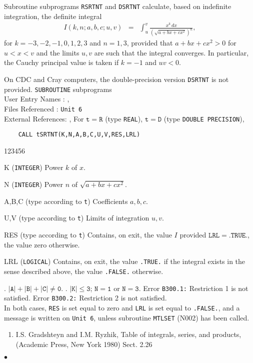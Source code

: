                           
                
\Submitter{}                     
Subroutine subprograms {\tt RSRTNT} and {\tt DSRTNT} calculate, based on
indefinite integration, the definite integral
\begin{eqnarray*}
I(k,n;a,b,c;u,v) & = & \displaystyle \int_u^v
\frac{x^k\,dx}{(\sqrt{a+bx+cx^2})^n},
\end{eqnarray*}
for $k=-3,-2,-1,0,1,2,3$ and $n=1,3$, provided that
$a+bx+cx^2 > 0$ for $u < x < v$ and the limits $u,v$ are such that
the integral converges. In particular, the Cauchy principal value
is taken if $k=-1$ and $uv < 0$.
 
On CDC and Cray computers, the double-precision version {\tt DSRTNT}
is not provided.
\Structure
{\tt SUBROUTINE} subprograms \\
User Entry   Names : , \\
Files  Referenced : {\tt Unit 6} \\
External References: , 
\Usage
For $\mathtt{t=R}$ (type {\tt REAL}), $\mathtt{t=D}$ (type
{\tt DOUBLE PRECISION}),
\begin{verbatim}
    CALL tSRTNT(K,N,A,B,C,U,V,RES,LRL)
\end{verbatim}
\begin{DLtt}{123456}
\item[K] ({\tt INTEGER}) Power $k$ of $x$.
\item[N] ({\tt INTEGER}) Power $n$ of $\sqrt{a+bx+cx^2}$.
\item[A,B,C] (type according to {\tt t}) Coefficients $a,b,c$.
\item[U,V] (type according to {\tt t}) Limits of integration $u,v$.
\item[RES] (type according to {\tt t}) Contains, on exit, the value
$I$ provided $\mathtt{LRL = .TRUE.}$, the value zero otherwise.
\item[LRL] ({\tt LOGICAL}) Contains, on exit, the value {\tt .TRUE.}
if the integral exists in the sense described above, the value
{\tt .FALSE.} otherwise.
\end{DLtt}
. \quad $\mathtt{|A|+|B|+|C| \ne 0}.$  . \quad $\mathtt{|K| \le 3}$; \quad
$\mathtt{N = 1}$ or $\mathtt{N = 3}$.
\Errorh
Error {\tt B300.1:} Restriction 1 is not satisfied.
Error {\tt B300.2:} Restriction 2 is not satisfied. \\
In both cases, {\tt RES} is set equal to zero and {\tt LRL} is set
equal to {\tt .FALSE.}, and a message is written on {\tt Unit 6},
unless subroutine {\tt MTLSET} (N002) has been called.
\Refer
\begin{enumerate}
\item  I.S. Gradshteyn and I.M. Ryzhik, Table of integrals, series,
and products, (Academic Press, New York 1980) Sect. 2.26
\end{enumerate}
$\bullet$
